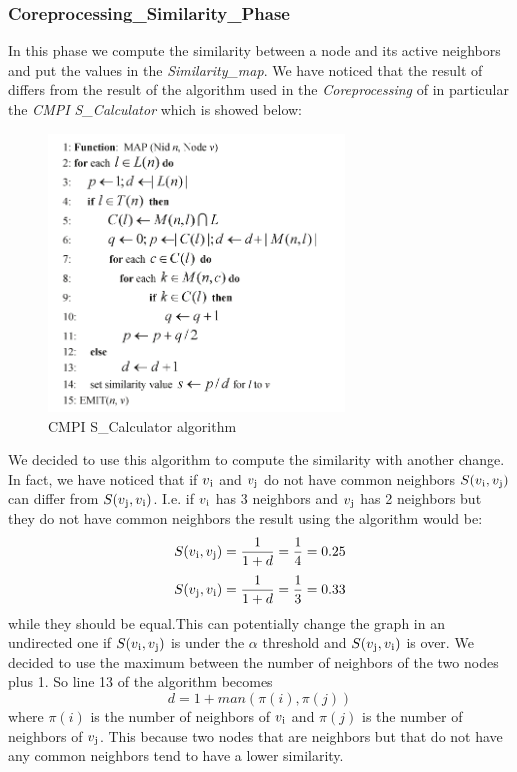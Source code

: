 \documentclass[12pt]{article}
\begin{document}
\subsubsection{Coreprocessing\_Similarity\_Phase}
In this phase we compute the similarity between a node and its active neighbors and put the values in the \emph{Similarity\_map}. We have noticed that the result of  differs from the result of the algorithm used in the \emph{Coreprocessing} of \cite{6517336} in particular the \emph{CMPI S\_Calculator} which is showed below:
     \begin{figure}[H]
       \centering
         \includegraphics[width=0.7\textwidth]{similarity-code.png}
       \caption{CMPI S\_Calculator algorithm}
       \label{fig:depold}
     \end{figure}
We decided to use this algorithm to compute the similarity with another change. In fact, we have noticed that
if $v\textsubscript{i}$ and $v\textsubscript{j}$ do not have common neighbors $S(v\textsubscript{i},v\textsubscript{j})$ can differ from  $S(v\textsubscript{j},v\textsubscript{i})$. I.e. if $v\textsubscript{i}$ has 3 neighbors and $v\textsubscript{j}$ has 2 neighbors but they do not have common neighbors the result using the algorithm would be:
\begin{equation}
  S(v\textsubscript{i},v\textsubscript{j}) = \frac{1}{1 + d} = \frac{1}{4} = 0.25
\end{equation}
\begin{equation}
  S(v\textsubscript{j},v\textsubscript{i}) = \frac{1}{1 + d} = \frac{1}{3} = 0.33
\end{equation}
while they should be equal.This can potentially change the graph in an undirected one if   $S(v\textsubscript{i},v\textsubscript{j})$ is under the $\alpha$ threshold and $S(v\textsubscript{j},v\textsubscript{i})$ is over.
We decided to use the maximum between the number of neighbors of the two nodes plus 1. So line 13 of the algorithm becomes
\begin{equation}
    d = 1 + man(\pi(i), \pi(j))
\end{equation}
where $\pi(i)$ is the number of neighbors of $v\textsubscript{i}$ and $\pi(j)$ is the number of neighbors of $v\textsubscript{j}$. This because two nodes that are neighbors but that do not have any common neighbors tend to have a lower similarity.
\end{document}
